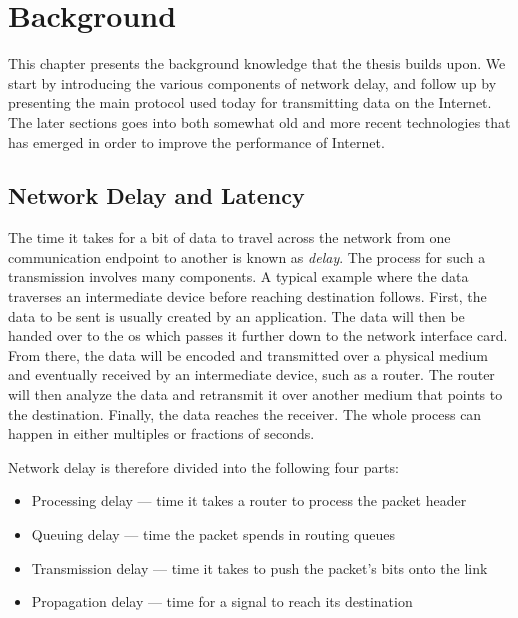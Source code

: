 \chapter{Background} \label{ch:background}

This chapter presents the background knowledge that the thesis builds upon. We start by introducing the various components of network delay, and follow up by presenting the main protocol used today for transmitting data on the Internet. The later sections goes into both somewhat old and more recent technologies that has emerged in order to improve the performance of Internet.









\section{Network Delay and Latency}

The time it takes for a bit of data to travel across the network from one communication endpoint to another is known as \textit{delay}. The process for such a transmission involves many components. A typical example where the data traverses an intermediate device before reaching destination follows. First, the data to be sent is usually created by an application. The data will then be handed over to the \gls{os} which passes it further down to the network interface card. From there, the data will be encoded and transmitted over a physical medium and eventually received by an intermediate device, such as a router. The router will then analyze the data and retransmit it over another medium that points to the destination. Finally, the data reaches the receiver. The whole process can happen in either multiples or fractions of seconds.

Network delay is therefore divided into the following four parts:

\begin{itemize}
    \item Processing delay --- time it takes a router to process the packet header
    \item Queuing delay --- time the packet spends in routing queues
    \item Transmission delay --- time it takes to push the packet's bits onto the link
    \item Propagation delay --- time for a signal to reach its destination
\end{itemize}

